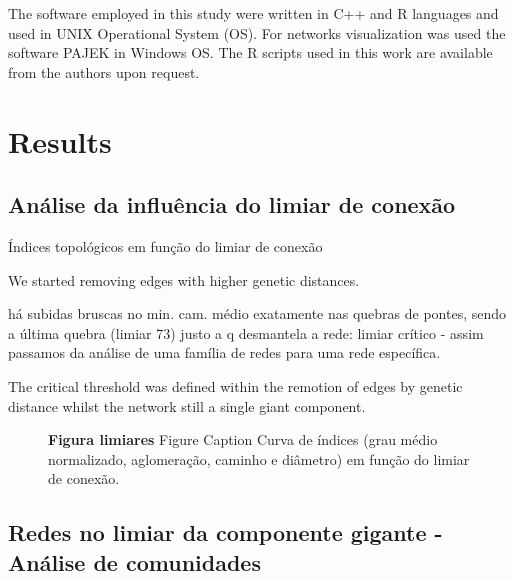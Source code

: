 \documentclass[10pt,letterpaper]{article}
\begin{document}
 
The software employed in this study were written in C++ and R \cite{R} languages and used in UNIX Operational System (OS). For networks visualization was used the software PAJEK \cite{Pajek} in Windows OS. The R scripts used in this work are available from the authors upon request.




\section*{Results}


\subsection*{Análise da influência do limiar de conexão}

Índices topológicos em função do limiar de conexão

We started removing edges with higher genetic distances. 

há subidas bruscas no min. cam. médio exatamente nas quebras de pontes, sendo a última quebra (limiar 73) justo a q desmantela a rede: limiar crítico - assim passamos da análise de uma família de redes para uma rede específica.  

The critical threshold was defined within the remotion of edges by genetic distance whilst the network still a single giant component.



\begin{figure}[h]
\caption{{\bf Figura limiares}
Figure Caption Curva de índices (grau médio normalizado, aglomeração, caminho e diâmetro) em função do limiar de conexão.}
\label{fig:limiares}
\end{figure}



\subsection*{Redes no limiar da componente gigante - Análise de comunidades}
\end{document}
